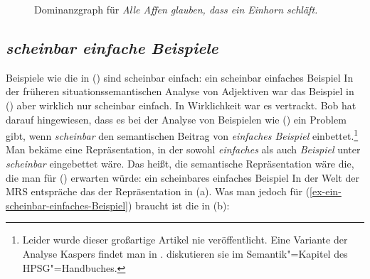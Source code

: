 \begin{figure}
\caption{Dominanzgraph für \emph{Alle Affen glauben, dass ein Einhorn schläft.}}\label{fig-alle-Affen-glauben-dass-ein-Einhorn-schläft}

\end{figure}

\subsection{\emph{scheinbar einfache Beispiele}}
\label{Abschnitt-scheinbar-einfache-Beispiele}

Beispiele wie die in () sind scheinbar einfach:
\ea
\label{ex-ein-scheinbar-einfaches-Beispiel}
ein scheinbar einfaches Beispiel
\z
In der früheren situationssemantischen Analyse von Adjektiven war das Beispiel in () aber
wirklich nur scheinbar einfach. In Wirklichkeit war es vertrackt. Bob \citet{Kasper97a} hat darauf hingewiesen,
dass es bei der Analyse von Beispielen wie () ein Problem gibt, wenn \emph{scheinbar} den
semantischen Beitrag von \emph{einfaches Beispiel} einbettet.\footnote{%
 Leider wurde dieser großartige Artikel nie veröffentlicht. Eine Variante der Analyse Kaspers
 findet man in . \citet[Section~3.2]{KR2024a} diskutieren sie im Semantik"=Kapitel des HPSG"=Handbuches.
} Man bekäme eine Repräsentation, in der sowohl \emph{einfaches} als auch \emph{Beispiel} unter
\emph{scheinbar} eingebettet wäre. Das heißt, die semantische Repräsentation wäre die, die man für
() erwarten würde:
\ea
ein scheinbares einfaches Beispiel
\z
In der Welt der MRS entspräche das der Repräsentation in (a). Was man jedoch für (\ref{ex-ein-scheinbar-einfaches-Beispiel}) braucht ist die in (b):

\eal
\ex {}
\ex
\label{mrs-ein-scheinbar-einfaches-Beispiel} 
\zl

